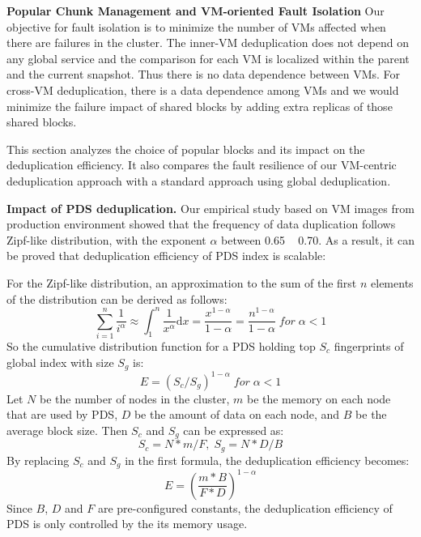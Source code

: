 {{\bf Popular Chunk Management and VM-oriented Fault Isolation}
Our objective for fault isolation is to minimize the number of VMs affected when there are failures
in the cluster.  The inner-VM deduplication does not depend on any global service and the comparison
for each VM is localized within the parent and the current snapshot.
Thus there is no data dependence between VMs.
For cross-VM deduplication, there is a data dependence among VMs and we would minimize the failure impact
of shared blocks by adding extra replicas of those shared blocks.

This section analyzes the choice of popular blocks and its impact on the deduplication efficiency.
It also  compares the  fault resilience of our VM-centric deduplication approach with a standard approach using 
global deduplication.


{\bf Impact of PDS deduplication.}
Our empirical study based on VM images from production environment\cite{ieeecloud} showed that the
frequency of data duplication follows Zipf-like distribution\cite{zipf},
with the exponent $\alpha$ between 0.65 ~ 0.70.
As a result, it can be proved that deduplication efficiency of PDS index is scalable:

For the Zipf-like distribution, an approximation to the sum of the first $n$ 
elements of the distribution can be derived as follows:
\begin{equation}
\sum_{i=1}^{n}\frac{1}{i^\alpha}\approx \int_{1}^{n}\frac{1}{x^\alpha}\mathrm{d}x=\frac{x^{1-\alpha}}{1-\alpha}=\frac{n^{1-\alpha}}{1-\alpha}\;  for\;  \alpha<1
\end{equation}
So the cumulative distribution function for a PDS holding top $S_c$ fingerprints
of global index with size $S_g$ is:
\begin{equation}
  E = (S_c / S_g)^{1-\alpha} \;  for\;  \alpha<1
\end{equation}
Let $N$ be the number of nodes in the cluster, $m$ be the memory on each node that are used by PDS, $D$ be the amount of data on each node, and $B$ be the average block size. Then $S_c$ and $S_g$ can be expressed as:
\begin{equation}
S_c = N*m/F, \; S_g = N*D/B
\end{equation}
By replacing $S_c$ and $S_g$ in the first formula, the deduplication efficiency becomes:
\begin{equation}
  E = (\frac{m*B}{F*D})^{1-\alpha}
\end{equation}
Since $B$, $D$ and $F$ are pre-configured constants, the deduplication efficiency of PDS is only controlled by the its memory usage.

}
